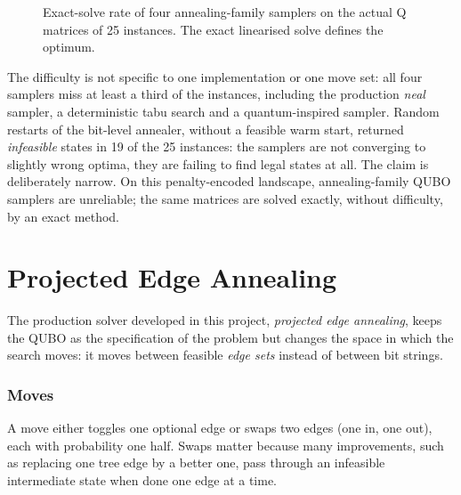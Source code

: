 \begin{figure}[htbp]
\centering
{}
\caption[Exact-solve rate of four annealing-family samplers on the actual Q matrices of 25 instances.]{Exact-solve rate of four annealing-family samplers on the actual Q
matrices of 25 instances. The exact linearised solve defines the optimum.}
\label{fig:sol:bars}
\end{figure}

The difficulty is not specific to one implementation or one move set: all
four samplers miss at least a third of the instances, including the
production \emph{neal} sampler, a deterministic tabu search and a
quantum-inspired sampler. Random restarts of the bit-level annealer, without
a feasible warm start, returned \emph{infeasible} states in 19 of the 25
instances: the samplers are not converging to slightly wrong optima, they
are failing to find legal states at all. The claim is deliberately narrow.
On this penalty-encoded landscape, annealing-family QUBO samplers are
unreliable; the same matrices are solved exactly, without difficulty, by an
exact method.

\section{Projected Edge Annealing}

The production solver developed in this project, \emph{projected edge
annealing}, keeps the QUBO as the specification of the problem but changes
the space in which the search moves: it moves between feasible \emph{edge
sets} instead of between bit strings.

\subsubsection{Moves} A move either toggles one optional edge or swaps two
edges (one in, one out), each with probability one half. Swaps matter
because many improvements, such as replacing one tree edge by a better one,
pass through an infeasible intermediate state when done one edge at a time.

